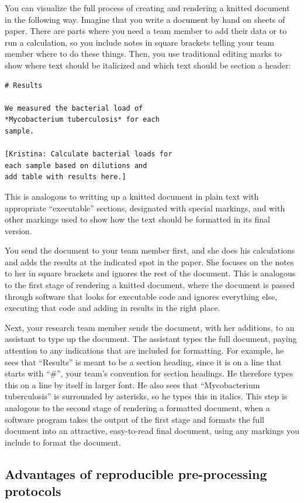 \documentclass[]{tufte-book}
\begin{document}
You can visualize the full process of creating and rendering a knitted document
in the following way. Imagine that you write a document by hand on sheets of
paper. There are parts where you need a team member to add their data or to run
a calculation, so you include notes in square brackets telling your team member
where to do these things. Then, you use traditional editing marks to show where
text should be italicized and which text should be section a header:

\begin{verbatim}
# Results

We measured the bacterial load of 
*Mycobacterium tuberculosis* for each 
sample. 

[Kristina: Calculate bacterial loads for 
each sample based on dilutions and
add table with results here.]
\end{verbatim}

This is analogous to writting up a knitted document in plain text with appropriate
``executable'' sections, designated with special markings, and with other markings
used to show how the text should be formatted in its final version.

You send the document to your team member first, and she does his calculations
and adds the results at the indicated spot in the paper. She focuses on the notes to
her in square brackets and ignores the rest of the document. This is analogous
to the first stage of rendering a knitted document, where the document is passed
through software that looks for executable code and ignores everything else,
executing that code and adding in results in the right place.

Next, your research team member sends the document, with her additions, to an
assistant to type up the document. The assistant types the full document, paying
attention to any indications that are included for formatting. For example, he
sees that ``Results'' is meant to be a section heading, since it is on a line that
starts with ``\#'', your team's convention for section headings. He therefore
types this on a line by itself in larger font. He also sees that ``Mycobacterium
tuberculosis'' is surrounded by asterisks, so he types this in italics. This
step is analogous to the second stage of rendering a formatted document, when
a software program takes the output of the first stage and formats the full
document into an attractive, easy-to-read final document, using any markings you
include to format the document.

\hypertarget{advantages-of-reproducible-pre-processing-protocols}{%
\subsection{Advantages of reproducible pre-processing protocols}\label{advantages-of-reproducible-pre-processing-protocols}}
\end{document}
